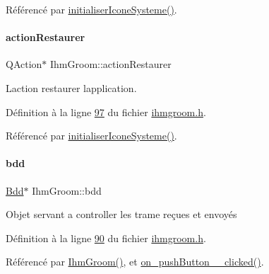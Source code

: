 Référencé par \hyperlink{ihmgroom_8cpp_source_l00106}{initialiser\+Icone\+Systeme()}.

\mbox{\label{class_ihm_groom_aa2df6badfa16f802411b502228fb8704}} 
\paragraph{\texorpdfstring{action\+Restaurer}{actionRestaurer}}
{\footnotesize\ttfamily Q\+Action$\ast$ Ihm\+Groom\+::action\+Restaurer\hspace{0.3cm}{\ttfamily [private]}}



L\textquotesingle{}action restaurer l\textquotesingle{}application. 



Définition à la ligne \hyperlink{ihmgroom_8h_source_l00097}{97} du fichier \hyperlink{ihmgroom_8h_source}{ihmgroom.\+h}.



Référencé par \hyperlink{ihmgroom_8cpp_source_l00106}{initialiser\+Icone\+Systeme()}.

\mbox{\label{class_ihm_groom_aba1bfff9bc610e6a626d3af4cec266f9}} 
\paragraph{\texorpdfstring{bdd}{bdd}}
{\footnotesize\ttfamily \hyperlink{class_bdd}{Bdd}$\ast$ Ihm\+Groom\+::bdd\hspace{0.3cm}{\ttfamily [private]}}

Objet servant a controller les trame reçues et envoyés 

Définition à la ligne \hyperlink{ihmgroom_8h_source_l00090}{90} du fichier \hyperlink{ihmgroom_8h_source}{ihmgroom.\+h}.



Référencé par \hyperlink{ihmgroom_8cpp_source_l00031}{Ihm\+Groom()}, et \hyperlink{ihmgroom_8cpp_source_l00196}{on\+\_\+push\+Button\+\_\+\_\+clicked()}.

\mbox{\label{class_ihm_groom_a8e2b551df75d8dffdfbc9beb6c3691ba}} 
